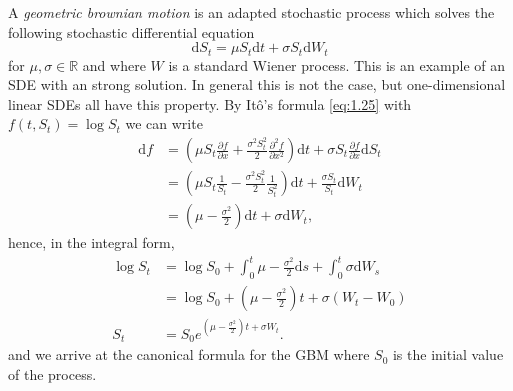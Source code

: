 \begin{definition}
    A \emph{geometric brownian motion} is an adapted stochastic process which solves 
    the following stochastic differential equation
    \begin{equation}
        \mathrm dS_t=\mu S_t\mathrm dt + \sigma S_t\mathrm dW_t
    \end{equation}
    for $\mu,\sigma\in\mathbb{R}$ and where $W$ is a standard Wiener process. This
    is an example of an SDE with an strong solution. In general this 
    is not the case, but one-dimensional linear SDEs all have this property.
    By It\^{o}'s formula \eqref{eq:1.25} with $f(t,S_t)=\log S_t$ we can write
    \begin{align*}
        \mathrm df&=\left(\mu S_t\frac{\partial f}{\partial x}+\frac{\sigma^2S_t^2}{2}\frac{\partial^2f}{\partial x^2}\right)\mathrm dt +\sigma S_t\frac{\partial f}{\partial x}\mathrm dS_t\\
        &=\left(\mu S_t\frac{1}{S_t}-\frac{\sigma^2S_t^2}{2}\frac{1}{S_t^2}\right)\mathrm dt+\frac{\sigma S_t}{S_t}\mathrm dW_t\\
        &=\left(\mu-\frac{\sigma^2}{2}\right)\mathrm dt+\sigma\mathrm dW_t,
    \end{align*}
    hence, in the integral form,
    \begin{align*}
        \log S_t&=\log S_0+\int_0^t\mu-\frac{\sigma^2}{2}\mathrm ds+\int_0^t\sigma\mathrm dW_s\\
        &=\log S_0+\left(\mu-\frac{\sigma^2}{2}\right)t+\sigma(W_t-W_0)\\
        S_t&=S_0e^{\left(\mu-\frac{\sigma^2}{2}\right)t+\sigma W_t}.
    \end{align*}
    and we arrive at the canonical formula for the GBM where $S_0$ is the initial 
    value of the process.
\end{definition}

